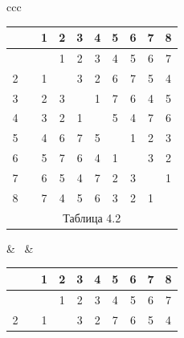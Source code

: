 \begin{center}





\begin{tabular}{ccc}





\begin{tabular}{cccccccccc}


\ & \vline & 1 & 2 & 3 & 4 & 5 & 6 & 7 & 8 \\


\hline


 1 & \vline & \ & 1 & 2 & 3 & 4 & 5 & 6 & 7 \\


2 & \vline & 1 & \ & 3 & 2 & 6 & 7 & 5 & 4 \\


3 & \vline & 2 & 3 & \ & 1 & 7 & 6 & 4 & 5 \\


4 & \vline & 3 & 2 & 1 & \ & 5 & 4 & 7 & 6 \\


5 & \vline & 4 & 6 & 7 & 5 & \ & 1 & 2 & 3 \\


6 & \vline & 5 & 7 & 6 & 4 & 1 & \ & 3 & 2 \\


7 & \vline & 6 & 5 & 4 & 7 & 2 & 3 & \ & 1 \\


8 & \vline & 7 & 4 & 5 & 6 & 3 & 2 & 1 & \ \\


\multicolumn{10}{c}{ Таблица 4.2}


\end{tabular}





& \ & 





\begin{tabular}{cccccccccc}


\ & \vline & 1 & 2 & 3 & 4 & 5 & 6 & 7 & 8 \\


\hline


 1 & \vline & \ & 1 & 2 & 3 & 4 & 5 & 6 & 7 \\


2 & \vline & 1 & \ & 3 & 2 & 7 & 6 & 5 & 4 \\



\end{tabular}
\end{tabular}
\end{center}
